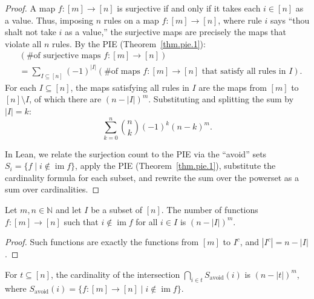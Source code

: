 \begin{proof}
A map $f\colon [m] \to [n]$ is surjective if and only if it takes each $i \in [n]$
as a value. Thus, imposing $n$ rules on a map $f\colon [m] \to [n]$, where
rule $i$ says ``thou shalt not take $i$ as a value,'' the surjective maps
are precisely the maps that violate all $n$ rules. By the PIE
(Theorem~\ref{thm.pie.1}):
\begin{align*}
& \left(\text{\# of surjective maps } f\colon [m] \to [n]\right) \\
& = \sum_{I \subseteq [n]} (-1)^{|I|}
\left(\text{\# of maps } f\colon [m] \to [n] \text{ that satisfy all rules in } I\right).
\end{align*}
For each $I \subseteq [n]$, the maps satisfying all rules in $I$ are
the maps from $[m]$ to $[n] \setminus I$, of which there are
$(n - |I|)^m$.
Substituting and splitting the sum by $|I| = k$:
\[
\sum_{k=0}^{n} \binom{n}{k} (-1)^k (n-k)^m.
\]

In Lean, we relate the surjection count to the PIE via the ``avoid'' sets
$S_i = \{f \mid i \notin \operatorname{im} f\}$, apply
the PIE (Theorem~\ref{thm.pie.1}), substitute the cardinality formula
for each subset, and rewrite the sum over the powerset as a sum over cardinalities.
\end{proof}

\begin{lemma}
\label{lem.pie.card_functions_avoiding_set}
\leanhelper
\leanok
Let $m, n \in \mathbb{N}$ and let $I$ be a subset of $[n]$. The number
of functions $f\colon [m] \to [n]$ such that $i \notin \operatorname{im} f$
for all $i \in I$ is $(n - |I|)^m$.
\end{lemma}

\begin{proof}
Such functions are exactly the functions from $[m]$ to $I^c$,
and $|I^c| = n - |I|$.
\end{proof}

\begin{lemma}
\label{lem.pie.card_inf_S_avoid}
\leanhelper
\leanok
For $t \subseteq [n]$, the cardinality of the intersection
$\bigcap_{i \in t} S_{\mathrm{avoid}}(i)$ is $(n - |t|)^m$,
where $S_{\mathrm{avoid}}(i) = \{f\colon [m] \to [n] \mid i \notin \operatorname{im} f\}$.
\end{lemma}


